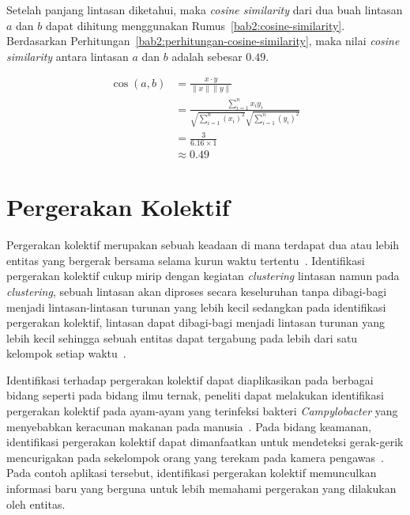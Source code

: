Setelah panjang lintasan diketahui, maka \textit{cosine similarity} dari dua buah lintasan $a$ dan $b$ dapat dihitung menggunakan Rumus~\ref{bab2:cosine-similarity}. Berdasarkan Perhitungan~\ref{bab2:perhitungan-cosine-similarity}, maka nilai \textit{cosine similarity} antara lintasan $a$ dan $b$ adalah sebesar $0.49$.

\begin{equation}
    \begin{aligned}
        \cos (a, b) & = \frac{x \cdot y}{\|x\| \|y\|} \\
        & = \frac{ \sum_{i=1}^{n}{x_i y_i}}{ \sqrt{\sum_{i=1}^{n}{(x_i)^2}} \sqrt{\sum_{i=1}^{n}{(y_i)^2}}} \\
        & = \frac{3}{6.16 \times 1} \\
        & \approx 0.49
    \end{aligned}
    \label{bab2:perhitungan-cosine-similarity}
\end{equation}


\section{Pergerakan Kolektif}
\label{sec:collective-movement}

Pergerakan kolektif merupakan sebuah keadaan di mana terdapat dua atau lebih entitas yang bergerak bersama selama kurun waktu tertentu~\cite{wiratma:trajectory}. Identifikasi pergerakan kolektif cukup mirip dengan kegiatan \textit{clustering} lintasan namun pada \textit{clustering}, sebuah lintasan akan diproses secara keseluruhan tanpa dibagi-bagi menjadi lintasan-lintasan turunan yang lebih kecil sedangkan pada identifikasi pergerakan kolektif, lintasan dapat dibagi-bagi menjadi lintasan turunan yang lebih kecil sehingga sebuah entitas dapat tergabung pada lebih dari satu kelompok setiap waktu~\cite{wiratma:trajectory}.

Identifikasi terhadap pergerakan kolektif dapat diaplikasikan pada berbagai bidang seperti pada bidang ilmu ternak, peneliti dapat melakukan identifikasi pergerakan kolektif pada ayam-ayam yang terinfeksi bakteri \textit{Campylobacter} yang menyebabkan keracunan makanan pada manusia~\cite{colles:02:chicken}. Pada bidang keamanan, identifikasi pergerakan kolektif dapat dimanfaatkan untuk mendeteksi gerak-gerik mencurigakan pada sekelompok orang yang terekam pada kamera pengawas~\cite{makris:01:security}. Pada contoh aplikasi tersebut, identifikasi pergerakan kolektif memunculkan informasi baru yang berguna untuk lebih memahami pergerakan yang dilakukan oleh entitas.

